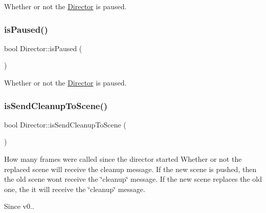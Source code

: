 Whether or not the \hyperlink{classDirector}{Director} is paused. \mbox{\label{classDirector_a18b86013970deb49290996518f0ddae5}} 
\subsubsection{\texorpdfstring{is\+Paused()}{isPaused()}\hspace{0.1cm}{\footnotesize\ttfamily [2/2]}}
{\footnotesize\ttfamily bool Director\+::is\+Paused (\begin{DoxyParamCaption}{ }\end{DoxyParamCaption})\hspace{0.3cm}{\ttfamily [inline]}}

Whether or not the \hyperlink{classDirector}{Director} is paused. \mbox{\label{classDirector_a882d9e2320d19b11b1cfab88a4439833}} 
\subsubsection{\texorpdfstring{is\+Send\+Cleanup\+To\+Scene()}{isSendCleanupToScene()}\hspace{0.1cm}{\footnotesize\ttfamily [1/2]}}
{\footnotesize\ttfamily bool Director\+::is\+Send\+Cleanup\+To\+Scene (\begin{DoxyParamCaption}{ }\end{DoxyParamCaption})\hspace{0.3cm}{\ttfamily [inline]}}

How many frames were called since the director started Whether or not the replaced scene will receive the cleanup message. If the new scene is pushed, then the old scene won\textquotesingle{}t receive the \char`\"{}cleanup\char`\"{} message. If the new scene replaces the old one, the it will receive the \char`\"{}cleanup\char`\"{} message. \begin{DoxySince}{Since}
v0.. 
\end{DoxySince}
\mbox{\label{classDirector_a882d9e2320d19b11b1cfab88a4439833}} 
